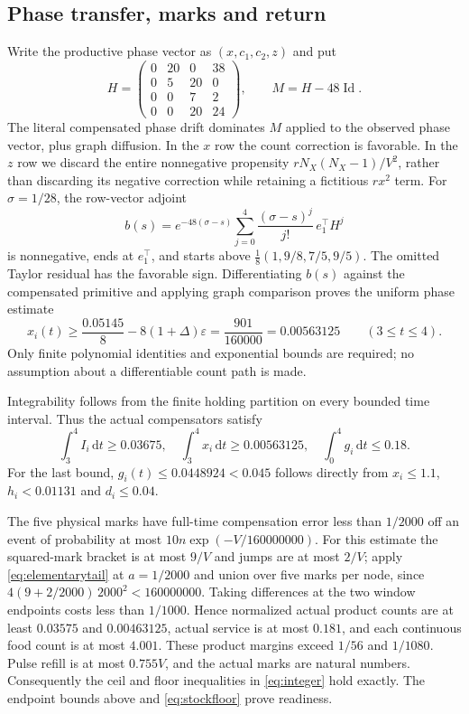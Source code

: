 \documentclass[11pt]{article}
\theoremstyle{definition}\newtheorem{definition}[theorem]{Definition}
\newcommand{\dd}{\,\mathrm dt}
\begin{document}
\subsection{Phase transfer, marks and return}
Write the productive phase vector as $(x,c_1,c_2,z)$ and put
\begin{equation}\label{eq:phase}
H=\begin{pmatrix}0&20&0&38\\0&5&20&0\\0&0&7&2\\0&0&20&24\end{pmatrix},
\qquad M=H-48\operatorname{Id}.
\end{equation}
The literal compensated phase drift dominates $M$ applied to the observed phase vector,
plus graph diffusion. In the $x$ row the count correction is favorable. In the $z$ row we
discard the entire nonnegative propensity $rN_X(N_X-1)/V^2$, rather than
discarding its negative correction while retaining a fictitious $rx^2$ term. For $\sigma=1/28$, the row-vector adjoint
\begin{equation}
b(s)=e^{-48(\sigma-s)}\sum_{j=0}^4\frac{(\sigma-s)^j}{j!}\,e_1^\top H^j
\end{equation}
is nonnegative, ends at $e_1^\top$, and starts above
$\tfrac18(1,9/8,7/5,9/5)$. The omitted Taylor residual has the favorable sign.
Differentiating $b(s)$ against the compensated primitive and applying graph comparison
proves the uniform phase estimate
\begin{equation}\label{eq:phasebound}
x_i(t)\ge\frac{0.05145}{8}-8(1+\Delta)\varepsilon
       =\frac{901}{160000}=0.00563125\qquad(3\le t\le4).
\end{equation}
Only finite polynomial identities and exponential bounds are required; no assumption
about a differentiable count path is made.

Integrability follows from the finite holding partition on every bounded time interval.
Thus the actual compensators satisfy
\begin{equation}\label{eq:compensators}
\int_3^4 I_i\dd\ge0.03675,\quad
\int_3^4 x_i\dd\ge0.00563125,\quad
\int_0^4 g_i\dd\le0.18.
\end{equation}
For the last bound, $g_i(t)\le0.0448924<0.045$ follows directly from $x_i\le1.1$,
$h_i<0.01131$ and $d_i\le0.04$.

The five physical marks have full-time compensation error less than $1/2000$ off an
event of probability at most $10n\exp(-V/160000000)$.
For this estimate the squared-mark bracket is at most $9/V$ and jumps are
at most $2/V$; apply \eqref{eq:elementarytail} at $a=1/2000$ and union over
five marks per node, since $4(9+2/2000)\,2000^2<160000000$.
Taking differences at the two
window endpoints costs less than $1/1000$. Hence normalized actual product counts are
at least $0.03575$ and $0.00463125$, actual service is at most $0.181$, and each continuous
food count is at most $4.001$. These product margins exceed $1/56$ and $1/1080$.
Pulse refill is at most $0.755V$, and the actual marks are natural numbers. Consequently
the ceil and floor inequalities in \eqref{eq:integer} hold exactly. The endpoint bounds
above and \eqref{eq:stockfloor} prove readiness.
\end{document}
